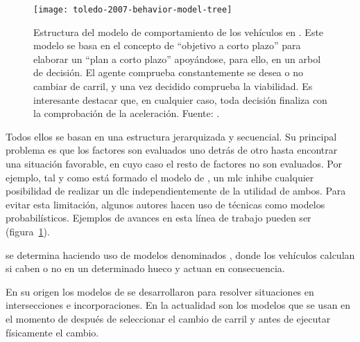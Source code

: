 \begin{figure}
	\texttt{[image: toledo-2007-behavior-model-tree]}
	\caption{Estructura del modelo de comportamiento de los vehículos en \cite{Toledo2007}. Este modelo se basa en el concepto de \enquote{objetivo a corto plazo} para elaborar un \enquote{plan a corto plazo} apoyándose, para ello, en un arbol de decisión. El agente comprueba constantemente se desea o no cambiar de carril, y una vez decidido comprueba la viabilidad. Es interesante destacar que, en cualquier caso, toda decisión finaliza con la comprobación de la aceleración. Fuente: \cite{Toledo2007}.}
	\label{fig:toledo-2007-behavior-model-tree}
\end{figure}

Todos ellos se basan en una estructura jerarquizada y secuencial. Su principal problema es que los factores son evaluados uno detrás de otro hasta encontrar una situación favorable, en cuyo caso el resto de factores no son evaluados. Por ejemplo, tal y como está formado el modelo de \cite{Hidas2002}, un \gls{mlc} inhibe cualquier posibilidad de realizar un \gls{dlc} independientemente de la utilidad de ambos. Para evitar esta limitación, algunos autores hacen uso de técnicas como modelos probabilísticos. Ejemplos de avances en esta línea de trabajo pueden ser \cite{Toledo2003, Toledo2007, Wei2000} (figura~\ref{fig:toledo-2007-behavior-model-tree}).


 se determina haciendo uso de modelos denominados \textit{}, donde los vehículos calculan si caben o no en un determinado hueco y actuan en consecuencia.

En su origen los modelos de \textit{} se desarrollaron para resolver situaciones en intersecciones e incorporaciones. En la actualidad son los modelos que se usan en el momento de después de seleccionar el cambio de carril y antes de ejecutar físicamente el cambio.

